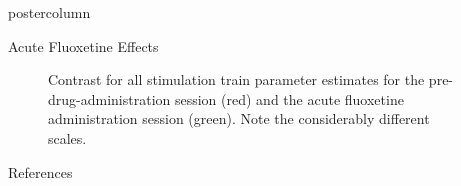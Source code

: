 \documentclass{beamer}
\begin{document}
\begin{frame}
\begin{columns}
\begin{column}{.48\textwidth}
\begin{beamercolorbox}[center]{postercolumn}
{\begin{myblock}{Acute Fluoxetine Effects}
\begin{figure}
\begin{minipage}{0.85\textwidth}
								\caption{Contrast for all stimulation train parameter estimates
								for the pre-drug-administration session (red) and the acute
								fluoxetine administration session (green).
								Note the considerably different scales.}
								\label{fig:fail}
							\end{minipage}
						\end{figure}
					\end{myblock}%
					\begin{myblock}{References}
						\footnotesize
						
						
					\end{myblock}%
		}
	\end{beamercolorbox}
	\end{column}
\end{columns}
\end{frame}
\end{document}
